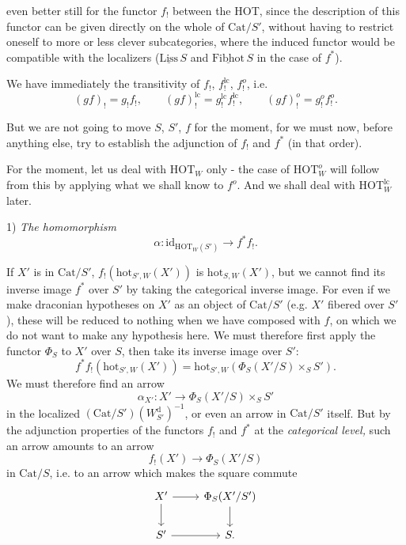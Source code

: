 \documentclass[11pt]{article}
\newcommand{\printedpage}[1]{\marginpar{\footnotesize p.~#1}}
\newcommand{\msp}[1]{\marginpar{\footnotesize [#1]}}
\newcommand{\HOT}{\mathrm{HOT}}
\newcommand{\hot}{\mathrm{hot}}
\newcommand{\Cat}{\mathrm{Cat}}
\newcommand{\id}{\mathrm{id}}
\newcommand{\Wd}{W^{\mathrm{d}}}
\begin{document}
\printedpage{84}
even better still for the functor $f_!$ between the HOT, since the description of this functor can be given directly on the whole of $\Cat/S'$, without having to restrict oneself to more or less \msp{page 138}clever subcategories, where the induced functor would be compatible with the localizers ($\underline{\mathrm{Liss}}\,S$ and $\underline{\mathrm{Fibhot}}\,S$ in the case of $f^*$).

We have immediately the transitivity of $f_!$, $f_!^{\mathrm{lc}}$, $f_!^{o}$, i.e.
\[
(gf)_! = g_!f_!, \qquad (gf)_!^{\mathrm{lc}} = g_!^{\mathrm{lc}}f_!^{\mathrm{lc}}, \qquad (gf)_!^{o} = g_!^{o}f_!^{o}.
\]

But we are not going to move $S$, $S'$, $f$ for the moment, for we must now, before anything else, try to establish the adjunction of $f_!$ and $f^*$ (in that order).

For the moment, let us deal with $\HOT_W$ only - the case of $\HOT_W^{o}$ will follow from this by applying what we shall know to $f^{o}$. And we shall deal with $\HOT_W^{\mathrm{lc}}$ later.

1) \textit{The homomorphism}
\[
\alpha : \id_{\HOT_W(S')} \longrightarrow f^*f_!.
\]

If $X'$ is in $\Cat/S'$, $f_!(\hot_{S',W}(X'))$ is $\hot_{S,W}(X')$, but we cannot find its inverse image $f^*$ over $S'$ by taking the categorical inverse image. For even if we make draconian hypotheses on $X'$ as an object of $\Cat/S'$ (e.g. $X'$ fibered over $S'$), these will be reduced to nothing when we have composed with $f$, on which we do not want to make any hypothesis here. We \msp{page 139}must therefore first apply the functor $\Phi_S$ to $X'$ over $S$, then take its inverse image over $S'$:
\[
f^*f_!(\hot_{S',W}(X')) = \hot_{S',W}(\Phi_S(X'/S)\times_S S').
\]
We must therefore find an arrow
\[
\alpha_{X'} : X' \longrightarrow \Phi_S(X'/S)\times_S S'
\]
in the localized $(\Cat/S')(\Wd_{S'})^{-1}$, or even an arrow in $\Cat/S'$ itself. But by the adjunction properties of the functors $f_!$ and $f^*$ at the \textit{categorical level,} such an arrow amounts to an arrow
\[
f_!(X') \longrightarrow \Phi_S(X'/S)
\]
in $\Cat/S$, i.e. to an arrow which makes the square commute
\[
\begin{tikzcd}
X' \arrow[r] \arrow[d] & \Phi_S(X'/S') \arrow[d] \\ %
S' \arrow[r] & S.
\end{tikzcd}
\]
\end{document}
